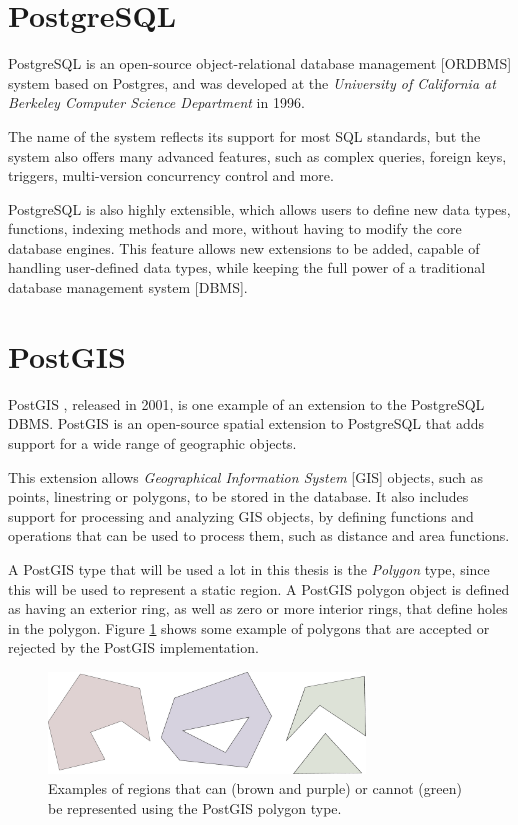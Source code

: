 
\section{PostgreSQL}
\label{section:postgresql}

PostgreSQL \cite{postgresql} is an open-source object-relational database management [ORDBMS] system based on Postgres, and was developed at the \textit{University of California at  Berkeley Computer Science Department} in 1996.

The name of the system reflects its support for most SQL standards, but the system also offers many advanced features, such as complex queries, foreign keys, triggers, multi-version concurrency control and more. 

PostgreSQL is also highly extensible, which allows users to define new data types, functions, indexing methods and more, without having to modify the core database engines. This feature allows new extensions to be added, capable of handling user-defined data types, while keeping the full power of a traditional database management system [DBMS].

\section{PostGIS}
\label{section:postgis}

PostGIS \cite{postgis}, released in 2001, is one example of an extension to the PostgreSQL DBMS. PostGIS is an open-source spatial extension to PostgreSQL that adds support for a wide range of geographic objects. 

This extension allows \textit{Geographical Information System} [GIS] objects, such as points, linestring or polygons, to be stored in the database. It also includes support for processing and analyzing GIS objects, by defining functions and operations that can be used to process them, such as distance and area functions.

A PostGIS type that will be used a lot in this thesis is the \textit{Polygon} type, since this will be used to represent a static region. A PostGIS polygon object is defined as having an exterior ring, as well as zero or more interior rings, that define holes in the polygon. Figure \ref{fig:polygons} shows some example of polygons that are accepted or rejected by the PostGIS implementation.

\begin{figure}[h!]
    \centering
    \includegraphics[width=0.75\textwidth]{images/polygons.pdf}
    \caption{Examples of regions that can (brown and purple) or cannot (green) be represented using the PostGIS polygon type.}
    \label{fig:polygons}
\end{figure}

